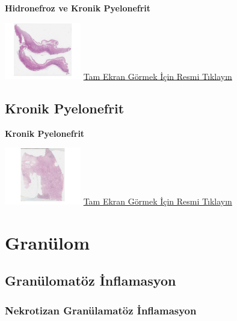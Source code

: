 \documentclass[
  letterpaper,
  DIV=11,
  numbers=noendperiod]{scrreprt}
\begin{document}
\textbf{Hidronefroz ve Kronik Pyelonefrit}

\href{https://images.patolojiatlasi.com/chronicpyelonephritis/HE2.html}{\includegraphics[width=0.25\textwidth,height=\textheight]{./screenshots/thumbnail_chronicpyelonephritis-2.png}}
\href{https://images.patolojiatlasi.com/chronicpyelonephritis/HE2.html}{Tam
Ekran Görmek İçin Resmi Tıklayın}

\hypertarget{sec-kronik-pyelonefrit}{%
\section{Kronik Pyelonefrit}\label{sec-kronik-pyelonefrit}}

\textbf{Kronik Pyelonefrit}

\href{https://images.patolojiatlasi.com/chronic-pyelonephritis/HE.html}{\includegraphics[width=0.25\textwidth,height=\textheight]{./screenshots/thumbnail_chronic-pyelonephritis.png}}
\href{https://images.patolojiatlasi.com/chronic-pyelonephritis/HE.html}{Tam
Ekran Görmek İçin Resmi Tıklayın}

\hypertarget{sec-granulom}{%
\chapter{Granülom}\label{sec-granulom}}

\hypertarget{sec-granulomatoz-inflamasyon}{%
\section{Granülomatöz İnflamasyon}\label{sec-granulomatoz-inflamasyon}}

\hypertarget{sec-nekrotizan-granulamatoz-inflamasyon}{%
\subsection{Nekrotizan Granülamatöz
İnflamasyon}\label{sec-nekrotizan-granulamatoz-inflamasyon}}
\end{document}
